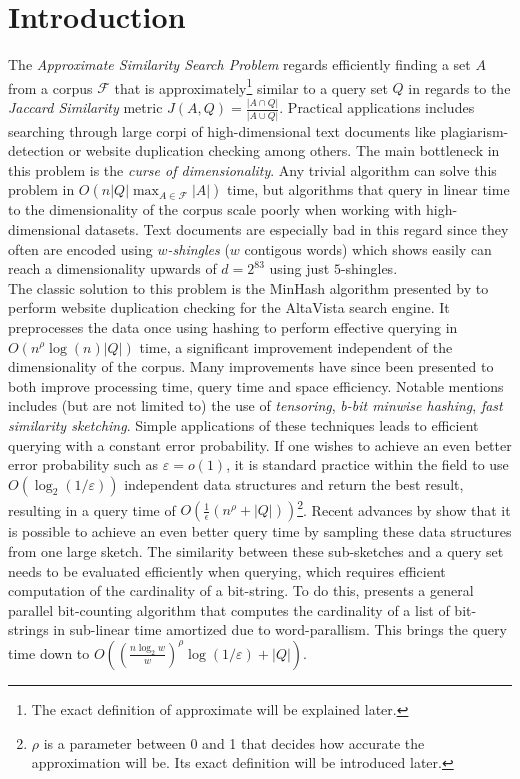 \section{Introduction}
The \textit{Approximate Similarity Search Problem} regards efficiently finding a set $A$ from a corpus $\mathcal{F}$ that is approximately\footnote{The exact definition of approximate will be explained later.} similar to a query set $Q$ in regards to the \textit{Jaccard Similarity} metric $J(A,Q) = \frac{|A\cap Q|}{|A\cup Q|}$\cite{dahlgaard2017fast}\cite{fast-similarity-search}. 
Practical applications includes searching through large corpi of high-dimensional text documents like plagiarism-detection or website duplication checking among others\cite{vassilvitskii2018}. The main bottleneck in this problem is the \textit{curse of dimensionality}. 
Any trivial algorithm can solve this problem in $O(n|Q|\max_{A\in \mathcal{F}}{|A|})$ time, but algorithms that query in linear time to the dimensionality of the corpus scale poorly when working with high-dimensional datasets. 
Text documents are especially bad in this regard since they often are encoded using \textit{$w$-shingles} ($w$ contigous words) which \citet{li2011hashing} shows easily can reach a dimensionality upwards of $d=2^{83}$ using just $5$-shingles.\\
The classic solution to this problem is the MinHash algorithm presented by \citet{broder1997minhash} to perform website duplication checking for the AltaVista search engine. 
It preprocesses the data once using hashing to perform effective querying in $O(n^\rho\log(n)|Q|)$ time, a significant improvement independent of the dimensionality of the corpus.
Many improvements have since been presented to both improve processing time, query time and space efficiency. 
Notable mentions includes (but are not limited to) the use of \textit{tensoring}\cite{andoni2006efficient}, \textit{b-bit minwise hashing}\cite{ping2011theory}, \textit{fast similarity sketching}\cite{dahlgaard2017fast}. 
Simple applications of these techniques leads to efficient querying with a constant error probability. If one wishes to achieve an even better error probability such as $\varepsilon = o(1)$, it is standard practice within the field to use $O(\log_2(1/\varepsilon))$ independent data structures and return the best result, resulting in a query time of $O(\frac{1}{\epsilon} (n^\rho + |Q|))$\footnote{$\rho$ is a parameter between 0 and 1 that decides how accurate the approximation will be. Its exact definition will be introduced later.}. 
Recent advances by \citet{fast-similarity-search} show that it is possible to achieve an even better query time by sampling these data structures from one large sketch. The similarity between these sub-sketches and a query set needs to be evaluated efficiently when querying, which requires efficient computation of the cardinality of a bit-string. To do this, \citet{fast-similarity-search} presents a general parallel bit-counting algorithm that computes the cardinality of a list of bit-strings in sub-linear time amortized due to word-parallism. This brings the query time down to $O((\frac{n\log_2 w}{w})^\rho \log(1/\varepsilon) + |Q|)$.\\
